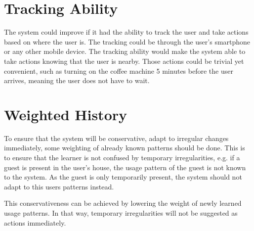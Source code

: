 \section{Tracking Ability}
The system could improve if it had the ability to track the user and take actions based on where the user is. The tracking could be through the user's smartphone or any other mobile device. The tracking ability would make the system able to take actions knowing that the user is nearby. Those actions could be trivial yet convenient, such as turning on the coffee machine 5 minutes before the user arrives, meaning the user does not have to wait.

\section{Weighted History}
To ensure that the system will be conservative, adapt to irregular changes immediately, some weighting of already known patterns should be done. This is to ensure that the learner is not confused by temporary irregularities, e.g. if a guest is present in the user's house, the usage pattern of the guest is not known to the system. As the guest is only temporarily present, the system should not adapt to this users patterns instead. 

This conservativeness can be achieved by lowering the weight of newly learned usage patterns. In that way, temporary irregularities will not be suggested as actions immediately.